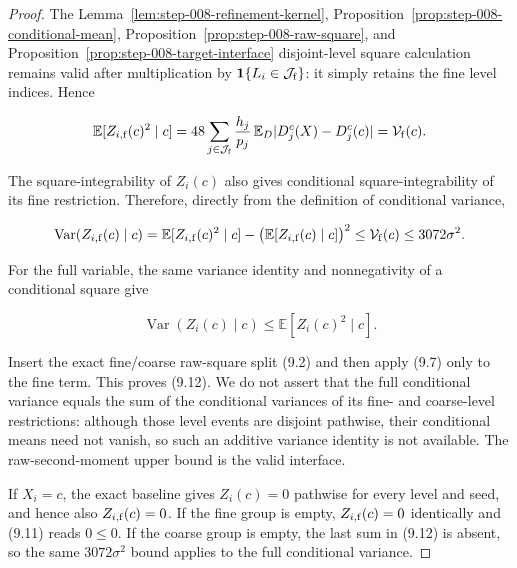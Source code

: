 \begin{proof}
The Lemma~\ref{lem:step-008-refinement-kernel}, Proposition~\ref{prop:step-008-conditional-mean}, Proposition~\ref{prop:step-008-raw-square}, and Proposition~\ref{prop:step-008-target-interface} disjoint-level square
calculation remains valid after multiplication by
\(\mathbf1\{L_i\in\mathcal J_{\rm f}\}\): it simply retains the fine level
indices. Hence

\[
\mathbb E[Z_{i,{\rm f}}(c)^2\mid c]
=48\sum_{j\in\mathcal J_{\rm f}}
\frac{h_j}{p_j}\,
\mathbb E_D|D_j^c(X)-D_j^c(c)|
=\mathcal V_{\rm f}(c).
\]

The square-integrability of \(Z_i(c)\) also gives conditional
square-integrability of its fine restriction. Therefore, directly from the
definition of conditional variance,

\[
\operatorname{Var}(Z_{i,{\rm f}}(c)\mid c)
=\mathbb E[Z_{i,{\rm f}}(c)^2\mid c]
-\bigl(\mathbb E[Z_{i,{\rm f}}(c)\mid c]\bigr)^2
\leq\mathcal V_{\rm f}(c)
\leq3072\sigma^2.
\]

For the full variable, the same variance identity and nonnegativity of a
conditional square give

\[
\operatorname{Var}(Z_i(c)\mid c)
\leq\mathbb E[Z_i(c)^2\mid c].
\]

Insert the exact fine/coarse raw-square split (9.2) and then apply (9.7) only
to the fine term. This proves (9.12). We do not assert that the full
conditional variance equals the sum of the conditional variances of its fine-
and coarse-level restrictions: although those level events are disjoint
pathwise, their conditional means need not vanish, so such an additive
variance identity is not available. The raw-second-moment upper bound is the
valid interface.

If \(X_i=c\), the exact baseline gives \(Z_i(c)=0\) pathwise for
every level and seed, and hence also \(Z_{i,{\rm f}}(c)=0\). If the fine group
is empty, \(Z_{i,{\rm f}}(c)=0\) identically and (9.11) reads \(0\leq0\). If
the coarse group is empty, the last sum in (9.12) is absent, so the same
\(3072\sigma^2\) bound applies to the full conditional variance.
\end{proof}

